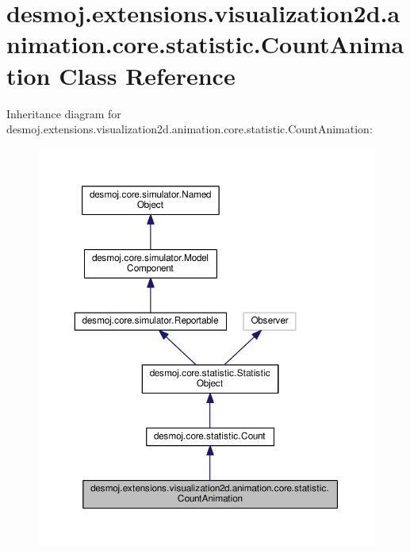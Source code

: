 \section{desmoj.\-extensions.\-visualization2d.\-animation.\-core.\-statistic.\-Count\-Animation Class Reference}
\label{classdesmoj_1_1extensions_1_1visualization2d_1_1animation_1_1core_1_1statistic_1_1_count_animation}


Inheritance diagram for desmoj.\-extensions.\-visualization2d.\-animation.\-core.\-statistic.\-Count\-Animation\-:
\nopagebreak
\begin{figure}[H]
\begin{center}
\leavevmode
\includegraphics[width=350pt]{classdesmoj_1_1extensions_1_1visualization2d_1_1animation_1_1core_1_1statistic_1_1_count_animation__inherit__graph}
\end{center}
\end{figure}


